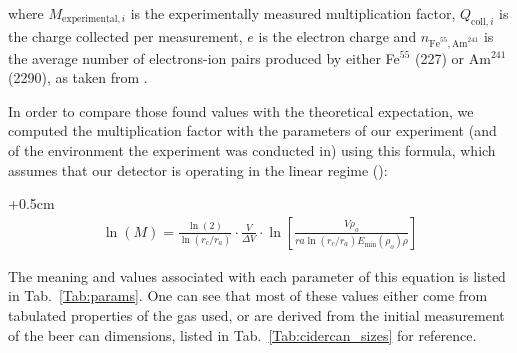 where $M_{\mathrm{experimental},i}$ is the experimentally measured multiplication factor, $Q_{\mathrm{coll},i}$ is the charge collected per measurement, $e$ is the electron charge and $n_{\mathrm{Fe}^{55},\mathrm{Am}^{241}}$ is the average number of electrons-ion pairs produced by either Fe$^{55}$ (227) or Am$^{241}$ (2290), as taken from \cite{can_paper}.

In order to compare those found values with the theoretical expectation, we computed the multiplication factor with the parameters of our experiment (and of the environment the experiment was conducted in) using this formula, which assumes that our detector is operating in the linear regime (\cite{gas_detect}):

\begin{adjustwidth}{+0.5cm}{}
\begin{align}
\ln(M)=\frac{\ln(2)}{\ln(r_{c}/r_{a})}\cdot\frac{V}{\Delta V}\cdot\ln\left[ \frac{V\rho_{o}}{ra\ln(r_{c}/r_{a})E_\mathrm{min}(\rho_{o})\rho}\right]
\label{eq:lnm}
\end{align}
\end{adjustwidth}

The meaning and values associated with each parameter of this equation is listed in Tab.~\ref{Tab:params}. One can see that most of these values either come from tabulated properties of the gas used, or are derived from the initial measurement of the beer can dimensions, listed in Tab.~\ref{Tab:cidercan_sizes} for reference.

